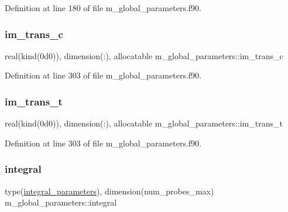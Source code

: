 Definition at line 180 of file m\+\_\+global\+\_\+parameters.\+f90.

\mbox{\label{namespacem__global__parameters_aa93addd83f0134aaaf319ca2b743233c}} 
\subsubsection{\texorpdfstring{im\+\_\+trans\+\_\+c}{im\_trans\_c}}
{\footnotesize\ttfamily real(kind(0d0)), dimension(\+:), allocatable m\+\_\+global\+\_\+parameters\+::im\+\_\+trans\+\_\+c}



Definition at line 303 of file m\+\_\+global\+\_\+parameters.\+f90.

\mbox{\label{namespacem__global__parameters_a62b213889b2dc5da7d81e7fa636231f6}} 
\subsubsection{\texorpdfstring{im\+\_\+trans\+\_\+t}{im\_trans\_t}}
{\footnotesize\ttfamily real(kind(0d0)), dimension(\+:), allocatable m\+\_\+global\+\_\+parameters\+::im\+\_\+trans\+\_\+t}



Definition at line 303 of file m\+\_\+global\+\_\+parameters.\+f90.

\mbox{\label{namespacem__global__parameters_ac1d4fc341c170b243af0d776ad7ede02}} 
\subsubsection{\texorpdfstring{integral}{integral}}
{\footnotesize\ttfamily type(\hyperlink{structm__derived__types_1_1integral__parameters}{integral\+\_\+parameters}), dimension(num\+\_\+probes\+\_\+max) m\+\_\+global\+\_\+parameters\+::integral}



